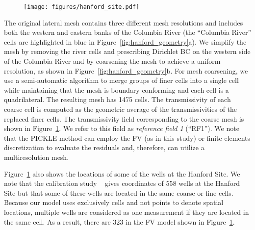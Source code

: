 \documentclass{agujournal2019}
\renewcommand{\caption}[2][]{\ignorespaces}
\begin{document}
\begin{figure}
    \centering
    \texttt{[image: figures/hanford\_site.pdf]}
    \caption{The coarse-resolution ($N_{FV}=1475$) RF1 $y$ field, well locations, and the parts of boundaries where different types of boundary conditions are prescribed.}
    \label{fig:hanford_site}
\end{figure}

The original lateral mesh contains three different mesh resolutions and includes both the western and eastern banks of the Columbia River (the ``Columbia River'' cells are highlighted in blue in Figure~\ref{fig:hanford_geometry}a).
We simplify the mesh by removing the river cells and prescribing Dirichlet BC on the western side of the Columbia River and by coarsening the mesh to achieve a uniform resolution, as shown in Figure~\ref{fig:hanford_geometry}b. 
For mesh coarsening, we use a semi-automatic algorithm to merge groups of finer cells into a single cell while maintaining that the mesh is boundary-conforming and each cell is a quadrilateral. The resulting mesh has 1475 cells. The transmissivity of each coarse cell is computed as the geometric average of the transmissivities of the replaced finer cells. %
The transmissivity field corresponding to the coarse mesh is shown in Figure~\ref{fig:hanford_site}.
We refer to this field as \emph{reference field 1} (``RF1'').
We note that the PICKLE method can employ the FV (as in this study) or finite elements discretization to evaluate the residuals and, therefore, can utilize a multiresolution mesh.

Figure~\ref{fig:hanford_site} also shows the locations of some of the wells at the Hanford Site. We note that the calibration study ~\citep{cole2001transient} gives coordinates of $558$ wells at the Hanford Site but that some of these wells are located in the same coarse or fine cells.
Because our model uses exclusively cells and not points to denote spatial locations, multiple wells are considered as one measurement if they are located in the same cell. As a result, there are 323 in the FV model shown in Figure~\ref{fig:hanford_site}.  

\end{document}

